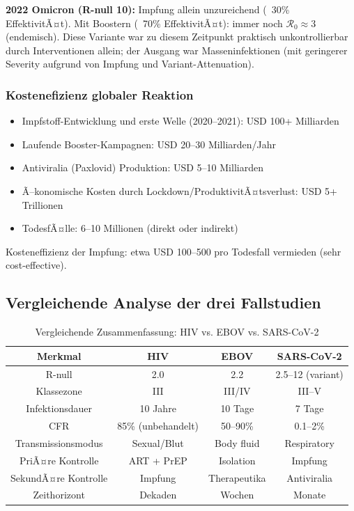 ﻿\documentclass[a4paper,12pt,twoside]{article}
\theoremstyle{definition}
\begin{document}
\textbf{2022 Omicron (R-null 10):} Impfung allein unzureichend (~30\% EffektivitÃ¤t). Mit Boostern (~70\% EffektivitÃ¤t): immer noch $\mathcal{R}_0 \approx 3$ (endemisch). Diese Variante war zu diesem Zeitpunkt praktisch unkontrollierbar durch Interventionen allein; der Ausgang war Masseninfektionen (mit geringerer Severity aufgrund von Impfung und Variant-Attenuation).

\subsubsection{Kostenefizienz globaler Reaktion}

\begin{itemize}
\item Impfstoff-Entwicklung und erste Welle (2020--2021): USD 100+ Milliarden
\item Laufende Booster-Kampagnen: USD 20--30 Milliarden/Jahr
\item Antiviralia (Paxlovid) Produktion: USD 5--10 Milliarden
\item Ã–konomische Kosten durch Lockdown/ProduktivitÃ¤tsverlust: USD 5+ Trillionen
\item TodesfÃ¤lle: 6--10 Millionen (direkt oder indirekt)
\end{itemize}

Kosteneffizienz der Impfung: etwa USD 100--500 pro Todesfall vermieden (sehr cost-effective).

\subsection{Vergleichende Analyse der drei Fallstudien}

\begin{table}[h!]
\centering
\caption{Vergleichende Zusammenfassung: HIV vs. EBOV vs. SARS-CoV-2}
\begin{tabular}{|c|c|c|c|}
\hline
\textbf{Merkmal} & \textbf{HIV} & \textbf{EBOV} & \textbf{SARS-CoV-2} \\
\hline
R-null & 2.0 & 2.2 & 2.5--12 (variant) \\
Klassezone & III & III/IV & III--V \\
Infektionsdauer & 10 Jahre & 10 Tage & 7 Tage \\
CFR & 85\% (unbehandelt) & 50--90\% & 0.1--2\% \\
Transmissionsmodus & Sexual/Blut & Body fluid & Respiratory \\
PriÃ¤re Kontrolle & ART + PrEP & Isolation & Impfung \\
SekundÃ¤re Kontrolle & Impfung & Therapeutika & Antiviralia \\
Zeithorizont & Dekaden & Wochen & Monate \\
\hline
\end{tabular}
\end{table}
\end{document}
